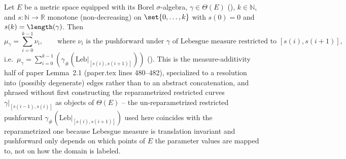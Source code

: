 \begin{lemma}
  Let $E$ be a metric space equipped with its Borel $\sigma$-algebra, $\gamma \in \Theta(E)$
  (), $k \in \mathbb{N}$, and $s \colon \mathbb{N} \to \mathbb{R}$ monotone
  (non-decreasing) on $\set{0,\dots,k}$ with $s(0)=0$ and $s(k)=\length(\gamma)$. Then
  \[
    \mu_\gamma = \sum_{i=0}^{k-1} \nu_i
    , \qquad \text{where } \nu_i \text{ is the pushforward under $\gamma$ of Lebesgue measure
    restricted to } [s(i),s(i+1)]
    ,
  \]
  i.e.\ $\mu_\gamma = \sum_{i=0}^{k-1} (\gamma_\# (\mathrm{Leb}|_{[s(i),s(i+1)]}))$
  (). This is the measure-additivity half of paper Lemma~2.1
  (paper.tex lines 480--482), specialized to a resolution into (possibly degenerate) edges rather
  than to an abstract concatenation, and phrased without first constructing the reparametrized
  restricted curves $\gamma|_{[s(i-1),s(i)]}$ as objects of $\Theta(E)$ -- the un-reparametrized
  restricted pushforward $\gamma_\#(\mathrm{Leb}|_{[s(i),s(i+1)]})$ used here coincides with the
  reparametrized one because Lebesgue measure is translation invariant and pushforward only depends
  on which points of $E$ the parameter values are mapped to, not on how the domain is labeled.
\end{lemma}
